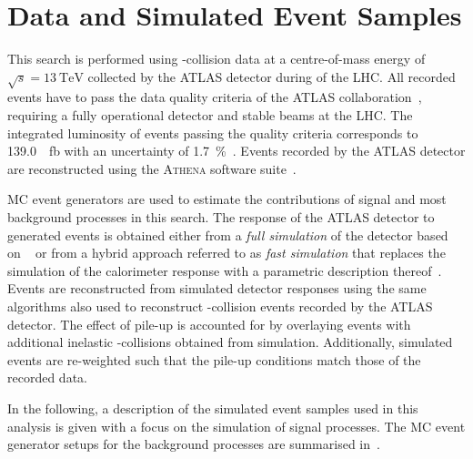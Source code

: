 \section{Data and Simulated Event Samples}%
\label{sec:data_and_simulation}

This search is performed using \pp-collision data at a centre-of-mass energy of
$\sqrt{s} = \SI{13}{\TeV}$ collected by the ATLAS detector during \RunTwo of the
LHC. All recorded events have to pass the data quality criteria of the ATLAS
collaboration~\cite{DAPR-2018-01}, requiring a fully operational detector and
stable beams at the LHC. The integrated luminosity of events passing the quality
criteria corresponds to \SI{139.0}{\per\femto\barn} with an uncertainty of
\SI{1.7}{\percent}~\cite{ATLAS-CONF-2019-021}. Events recorded by the ATLAS
detector are reconstructed using the \textsc{Athena} software
suite~\cite{ATL-SOFT-PUB-2021-001}.


MC event generators are used to estimate the contributions of signal and most
background processes in this search. The response of the ATLAS detector to
generated events is obtained either from a \emph{full simulation} of the
detector based on \GEANT~\cite{SOFT-2010-01,Agostinelli:2002hh} or from a hybrid
approach referred to as \emph{fast simulation} that replaces the simulation of
the calorimeter response with a parametric description
thereof~\cite{SOFT-2010-01}. Events are reconstructed from simulated detector
responses using the same algorithms also used to reconstruct \pp-collision
events recorded by the ATLAS detector. The effect of pile-up is accounted for by
overlaying events with additional inelastic \pp-collisions obtained from
simulation. Additionally, simulated events are re-weighted such that the pile-up
conditions match those of the recorded data.

In the following, a description of the simulated event samples used in this
analysis is given with a focus on the simulation of signal processes. The MC
event generator setups for the background processes are summarised
in~.

